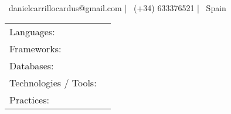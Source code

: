 \documentclass[]{awesome-cv}
\begin{document}
    
\begin{center}
	  \\
	\vspace{2mm}
	{\hspace{0.8cm}\faEnvelope\ danielcarrillocardus@gmail.com}  |  {\faMobile\ (+34) 633376521}  |  {\faMapMarker\ Spain} 
\end{center}

\begin{cventries}
	\cventry
	{}
	{\def\arraystretch{1.15}{\begin{tabular}{ l l }
		Languages:  & {\skill{ C\#, JavaScript, TypeScript, Terraform, SQL, HTML, CSS.}} \\
		Frameworks:  & {\skill{ .NET, Vue.js, Node.js, Cypress.js}} \\
		Databases:  & {\skill{ DynamoDB, ElasticSearch/OpenSearch, PostgreSQL.}} \\
		Technologies / Tools: \hspace{0.05cm} & {\skill{ AWS, Lambda, Step Functions, REST, gRPC, npm, Git, GitHub Actions.}} \\
		Practices:  & {\skill{ Agile, Scrum, SOLID Principles, Test-Driven Development, Code Reviews.}} \\
		\end{tabular}}}
	{}
	{}
	{}
\end{cventries}
\vspace{-7mm}
\end{document}
